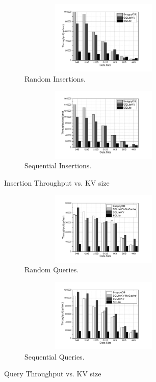 \begin{figure}
	\centering
	\begin{subfigure}[b]{0.4\textwidth}
		\includegraphics[width=0.9\textwidth, height=3.5cm]{Ext/R-Write.pdf}
		\caption{\small Random Insertions.}
		\label{fig:R-write}
	\end{subfigure}
	\hspace{0.7cm}
	\begin{subfigure}[b]{0.4\textwidth}
		\includegraphics[width=0.9\textwidth, height=3.5cm]{Ext/S-Write.pdf}
		\caption{\small Sequential Insertions.}
		\label{fig:S-write}
	\end{subfigure}
	\caption{\small Insertion Throughput vs. KV size}
\end{figure}

\begin{figure}
	\centering
	\begin{subfigure}[b]{0.4\textwidth}
		\includegraphics[width=0.9\textwidth, height=3.5cm]{pic/R-read.pdf}
		\caption{\small Random Queries.}
		\label{fig:R-read}
	\end{subfigure}
	\hspace{0.7cm}
	\begin{subfigure}[b]{0.4\textwidth}
		\includegraphics[width=0.9\textwidth, height=3.5cm]{pic/S-read.pdf}
		\caption{\small Sequential Queries.}
		\label{fig:S-read}
	\end{subfigure}
	
	\caption{\small Query Throughput vs. KV size}
	\label{fig:queryPerformance}
\end{figure}
